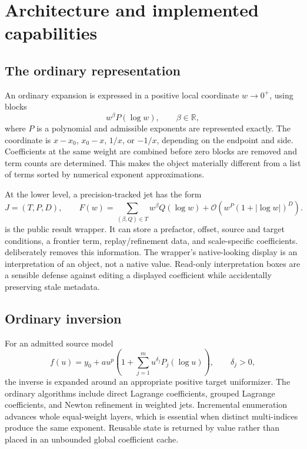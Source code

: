 \documentclass[11pt,a4paper]{article}
\newcommand{\code}[1]{\texttt{\detokenize{#1}}}
\newcommand{\OO}{\mathcal O}
\newcommand{\R}{\mathbb R}
\begin{document}
\section{Architecture and implemented capabilities}\label{sec:architecture}

\subsection{The ordinary representation}
An ordinary expansion is expressed in a positive local coordinate \(w\to0^+\), using blocks
\[
 w^{\beta}P(\log w),\qquad \beta\in\R,
\]
where \(P\) is a polynomial and admissible exponents are represented exactly. The coordinate is \(x-x_0\), \(x_0-x\), \(1/x\), or \(-1/x\), depending on the endpoint and side. Coefficients at the same weight are combined before zero blocks are removed and term counts are determined. This makes the object materially different from a list of terms sorted by numerical exponent approximations.\cite{repo-main,repo-guide}

At the lower level, a precision-tracked jet has the form
\[
 J=(T,P,D),\qquad
 F(w)=\sum_{(\beta,Q)\in T}w^\beta Q(\log w)
       +\OO\!\left(w^P(1+|\log w|)^D\right).
\]
\code{GeneralizedSeries[association]} is the public result wrapper. It can store a prefactor, offset, source and target conditions, a frontier term, replay/refinement data, and scale-specific coefficients. \code{Normal[s]} deliberately removes this information. The wrapper's native-looking display is an interpretation of an object, not a native \code{SeriesData} value. Read-only interpretation boxes are a sensible defense against editing a displayed coefficient while accidentally preserving stale metadata.\cite{repo-main,repo-operations,repo-guide}

\subsection{Ordinary inversion}
For an admitted source model
\[
 f(u)=y_0+a u^p\left(1+\sum_{j=1}^m u^{\delta_j}P_j(\log u)\right),
 \qquad \delta_j>0,
\]
the inverse is expanded around an appropriate positive target uniformizer. The ordinary algorithms include direct Lagrange coefficients, grouped Lagrange coefficients, and Newton refinement in weighted jets. Incremental enumeration advances whole equal-weight layers, which is essential when distinct multi-indices produce the same exponent. Reusable state is returned by value rather than placed in an unbounded global coefficient cache.\cite{repo-main,repo-incremental}
\end{document}
